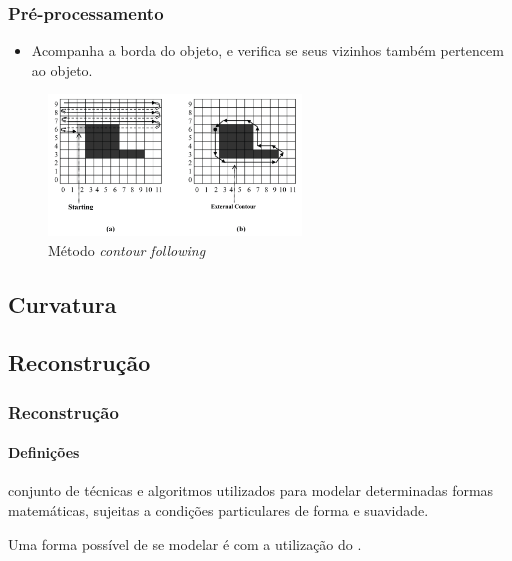 \begin{frame}
\frametitle{Pré-processamento}

\begin{itemize}
	\item Acompanha a borda do objeto, e verifica se seus vizinhos também pertencem ao objeto.
\end{itemize}

\begin{figure}[hbt]
	\begin{center}
		\caption{Método \textit{contour following}~\cite{book_shape}}
		\includegraphics[width=0.6\textwidth]{img/contorno.png}
	\end{center}
\end{figure}
\end{frame}

\subsection{Curvatura}


\subsection{Reconstrução}

\begin{frame}
\frametitle{Reconstrução}
\framesubtitle{Definições}

 conjunto de técnicas e algoritmos utilizados para modelar determinadas formas matemáticas, sujeitas a condições particulares de forma e suavidade.


\medskip
Uma forma possível de se modelar é com a utilização do  \cite{Sorkine2006}.

\end{frame}

